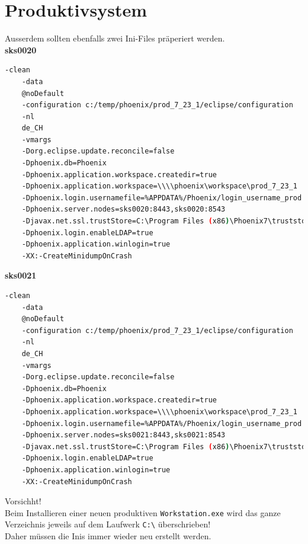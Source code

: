 
\chapter{Produktivsystem}
\begin{flushleft}
    Ausserdem sollten ebenfalls zwei Ini-Files präperiert werden.\\
    \textbf{sks0020}\\
    \lstset{style=gra_codestyle}
    \begin{lstlisting}[language=sh, caption=Workstation.ini PROD sks0020,captionpos=b,label={lst:workstation.ini-prod-sks0020},breaklines=true]
    -clean
    -data
    @noDefault
    -configuration c:/temp/phoenix/prod_7_23_1/eclipse/configuration
    -nl
    de_CH
    -vmargs
    -Dorg.eclipse.update.reconcile=false
    -Dphoenix.db=Phoenix
    -Dphoenix.application.workspace.createdir=true
    -Dphoenix.application.workspace=\\\\phoenix\workspace\prod_7_23_1
    -Dphoenix.login.usernamefile=%APPDATA%/Phoenix/login_username_prod
    -Dphoenix.server.nodes=sks0020:8443,sks0020:8543
    -Djavax.net.ssl.trustStore=C:\Program Files (x86)\Phoenix7\truststore.jks
    -Dphoenix.login.enableLDAP=true
    -Dphoenix.application.winlogin=true
    -XX:-CreateMinidumpOnCrash
    \end{lstlisting}
    \textbf{sks0021}\\
    \lstset{style=gra_codestyle}
    \begin{lstlisting}[language=sh, caption=Workstation.ini PROD sks0021,captionpos=b,label={lst:workstation.ini-prod-sks0021},breaklines=true]
    -clean
    -data
    @noDefault
    -configuration c:/temp/phoenix/prod_7_23_1/eclipse/configuration
    -nl
    de_CH
    -vmargs
    -Dorg.eclipse.update.reconcile=false
    -Dphoenix.db=Phoenix
    -Dphoenix.application.workspace.createdir=true
    -Dphoenix.application.workspace=\\\\phoenix\workspace\prod_7_23_1
    -Dphoenix.login.usernamefile=%APPDATA%/Phoenix/login_username_prod
    -Dphoenix.server.nodes=sks0021:8443,sks0021:8543
    -Djavax.net.ssl.trustStore=C:\Program Files (x86)\Phoenix7\truststore.jks
    -Dphoenix.login.enableLDAP=true
    -Dphoenix.application.winlogin=true
    -XX:-CreateMinidumpOnCrash
    \end{lstlisting}
    \begin{mdframed}
    Vorsichht!\\Beim Installieren einer neuen produktiven \texttt{Workstation.exe} wird das ganze Verzeichnis jeweils auf dem Laufwerk \texttt{C:\textbackslash} überschrieben!\\Daher müssen die Inis immer wieder neu erstellt werden.
    \end{mdframed}
\end{flushleft}
